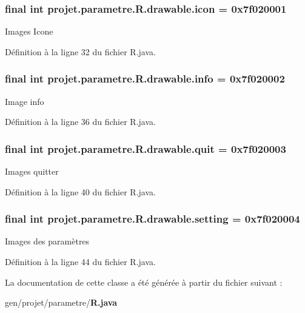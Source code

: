 \subsubsection[{icon}]{\setlength{\rightskip}{0pt plus 5cm}final int {\bf projet.\-parametre.\-R.\-drawable.\-icon} = 0x7f020001\hspace{0.3cm}{\ttfamily  [static]}}\label{classprojet_1_1parametre_1_1_r_1_1drawable_a9b0ea1b7f7af38d8cf9d8403e5c83e2d}
\-Images \-Icone 

\-Définition à la ligne 32 du fichier \-R.\-java.

\subsubsection[{info}]{\setlength{\rightskip}{0pt plus 5cm}final int {\bf projet.\-parametre.\-R.\-drawable.\-info} = 0x7f020002\hspace{0.3cm}{\ttfamily  [static]}}\label{classprojet_1_1parametre_1_1_r_1_1drawable_a9dc7a0bcbde356dde0262fd96af54d05}
\-Image info 

\-Définition à la ligne 36 du fichier \-R.\-java.

\subsubsection[{quit}]{\setlength{\rightskip}{0pt plus 5cm}final int {\bf projet.\-parametre.\-R.\-drawable.\-quit} = 0x7f020003\hspace{0.3cm}{\ttfamily  [static]}}\label{classprojet_1_1parametre_1_1_r_1_1drawable_aa366cf89c0e08ce1496e07e97cf3beef}
\-Images quitter 

\-Définition à la ligne 40 du fichier \-R.\-java.

\subsubsection[{setting}]{\setlength{\rightskip}{0pt plus 5cm}final int {\bf projet.\-parametre.\-R.\-drawable.\-setting} = 0x7f020004\hspace{0.3cm}{\ttfamily  [static]}}\label{classprojet_1_1parametre_1_1_r_1_1drawable_a55654b0de23b9bfb6b51a354a4b80635}
\-Images des paramètres 

\-Définition à la ligne 44 du fichier \-R.\-java.



\-La documentation de cette classe a été générée à partir du fichier suivant \-:\begin{DoxyCompactItemize}
\item 
gen/projet/parametre/{\bf \-R.\-java}\end{DoxyCompactItemize}
